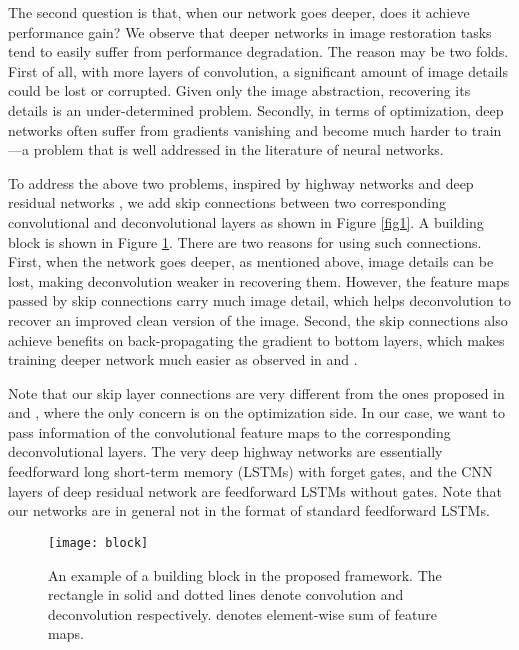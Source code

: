 \documentclass[10pt,journal,compsoc]{IEEEtran}
\begin{document}
The second question is that, when our network goes deeper, does it achieve performance gain?
We observe that deeper networks in image restoration tasks tend to easily suffer from
performance degradation. The reason may be two folds. First of all, with more layers of
convolution, a significant amount of image details could be lost or corrupted. Given only the image abstraction,
recovering its details is an under-determined problem. Secondly, in terms of optimization,
deep networks often suffer from gradients vanishing and become much harder to train---a problem
that is well addressed in the literature of neural networks.


To address the above two problems, inspired by highway networks \cite{DBLP:journals/corr/SrivastavaGS15}
and deep residual networks \cite{DBLP:journals/corr/HeZRS15}, we add skip connections between
two corresponding convolutional and deconvolutional layers as shown in Figure \ref{fig1}.
A building block is shown in Figure \ref{fig4}. There are two reasons for using such connections.
First, when the network goes deeper, as mentioned above, image details can be lost, making deconvolution
weaker in recovering them. However, the feature maps passed by skip connections carry much image detail,
which helps deconvolution to recover an improved clean version of the image. Second, the skip connections also achieve
benefits on back-propagating the gradient to bottom layers, which makes training deeper network much
easier as observed in \cite{DBLP:journals/corr/SrivastavaGS15} and \cite{DBLP:journals/corr/HeZRS15}.

Note that our skip layer connections are very different from the ones proposed in
\cite{DBLP:journals/corr/SrivastavaGS15} and \cite{DBLP:journals/corr/HeZRS15}, where the only concern
is on the optimization side. In our case, we want to pass information of the convolutional feature maps
to the corresponding deconvolutional layers. The very deep highway networks
\cite{DBLP:journals/corr/SrivastavaGS15} are essentially feedforward long short-term memory (LSTMs)
with forget gates, and the CNN layers of deep residual network \cite{DBLP:journals/corr/HeZRS15}
are feedforward LSTMs without gates. Note that our networks are in general not in the format of
standard feedforward LSTMs.

\begin{figure}[htb!]
\centering
\texttt{[image: block]}
\caption{An example of a building block in the proposed framework. The rectangle in solid and
dotted lines denote convolution and deconvolution respectively.  denotes element-wise sum of feature maps.}
\label{fig4}
\end{figure}
\end{document}

